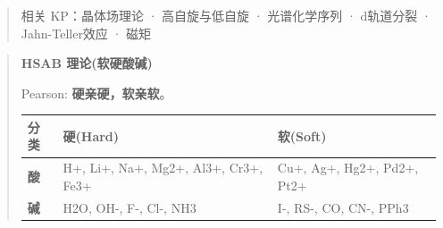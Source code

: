 \documentclass[a4paper,11pt]{ctexart}
\newcounter{none}
\newcommand{\箭}{\ensuremath{\rightarrow}}
\newcommand{\左箭}{\ensuremath{\leftarrow}}
\newcommand{\上箭}{\ensuremath{\uparrow}}
\newcommand{\下箭}{\ensuremath{\downarrow}}
\newcommand{\衡}{\ensuremath{\rightleftharpoons}}
\newcommand{\双箭}{\ensuremath{\leftrightarrow}}
\newcommand{\约等于}{\ensuremath{\approx}}
\newcommand{\小于等于}{\ensuremath{\leq}}
\newcommand{\大于等于}{\ensuremath{\geq}}
\newcommand{\不等于}{\ensuremath{\neq}}
\newcommand{\西格马}{\ensuremath{\sigma}}
\newcommand{\派}{\ensuremath{\pi}}
\begin{document}
\begin{quote}
相关 KP：晶体场理论 · 高自旋与低自旋 · 光谱化学序列 · d轨道分裂 · Jahn-Teller效应 · 磁矩
\end{quote}

\begin{quote}
\textbf{HSAB 理论(软硬酸碱)}

Pearson: \textbf{硬亲硬，软亲软}。

{\def\LTcaptype{none} %
\begin{longtable}[]{@{}
  >{\raggedright\arraybackslash}p{}
  >{\raggedright\arraybackslash}p{}
  >{\raggedright\arraybackslash}p{}@{}}
\toprule\noalign{}
\begin{minipage}[b]{\linewidth}\raggedright
分类
\end{minipage} & \begin{minipage}[b]{\linewidth}\raggedright
硬(Hard)
\end{minipage} & \begin{minipage}[b]{\linewidth}\raggedright
软(Soft)
\end{minipage} \\
\midrule\noalign{}
\endhead
\bottomrule\noalign{}
\endlastfoot
\textbf{酸} & H+, Li+, Na+, Mg2+, Al3+, Cr3+, Fe3+ & Cu+, Ag+, Hg2+, Pd2+, Pt2+ \\
\textbf{碱} & H2O, OH-, F-, Cl-, NH3 & I-, RS-, CO, CN-, PPh3 \\
\end{longtable}
}
\end{quote}
\end{document}
